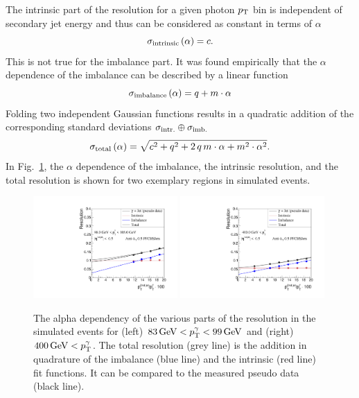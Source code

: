 The intrinsic part of the resolution for a given photon $p_{\text{T}}$ bin is independent of secondary jet energy and thus can be considered as constant in terms of $\alpha$
\begin{equation}\label{eq:intrinsic}
 \sigma_\mathrm{intrinsic} \left( \alpha\right) = c.
\end{equation}
This is not true for the imbalance part. It was found empirically that the $\alpha$ dependence of the imbalance can be described by a linear function 
\begin{equation}\label{eq:imbalance}
  \sigma_\mathrm{imbalance} \left( \alpha\right) = q + m \cdot \alpha
\end{equation}
Folding two independent Gaussian functions results in a quadratic addition of the corresponding standard deviations $\sigma_\mathrm{intr.}\oplus\sigma_\mathrm{imb.}$ 
\begin{equation}\label{eq:total}
  \sigma_\mathrm{total} \left( \alpha \right) = \sqrt{ c^2 + q^2  + 2\, q\, m \cdot \alpha +m^2 \cdot \alpha^2}. 
\end{equation}
In Fig.~\ref{fig:AlphaDependenceOfResolutions}, the $\alpha$ dependence of the imbalance, the intrinsic resolution, and the total resolution is shown for two exemplary \ptgamma regions in simulated events. 
\begin{figure}[!b]
 \centering
    \includegraphics[width=0.49\textwidth]{figures/resolution/methodology/JER_for_1_eta_bin_4_pTGamma_bin_all_contributions_PFCHS_RMS99_mc.pdf} 
    \includegraphics[width=0.49\textwidth]{figures/resolution/methodology/JER_for_1_eta_bin_12_pTGamma_bin_all_contributions_PFCHS_RMS99_mc.pdf} 
  \caption{The alpha dependency of the various parts of the resolution in the simulated events for (left) $83 \,\text{Ge}\kern-0.06667em\text{V} < p_{\text{T}}^{\gamma} < 99 \,\text{Ge}\kern-0.06667em\text{V} $ and (right) $400 \,\text{Ge}\kern-0.06667em\text{V} < p_{\text{T}}^{\gamma}$. 
           The total resolution (grey line) is the addition in quadrature of the imbalance (blue line) and the intrinsic (red line) 
  fit functions. It can 
  be compared to the measured pseudo data (black line).}  
 \label{fig:AlphaDependenceOfResolutions}
\end{figure}
